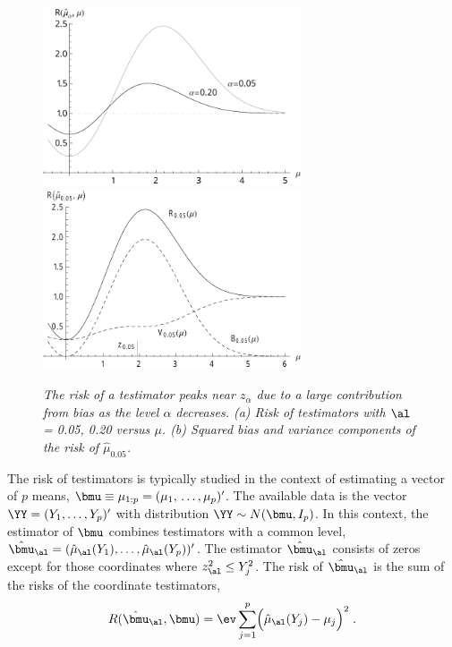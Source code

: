 \documentclass{gSCS2e}
\begin{document}
 \begin{figure}
 \caption{ \label{fig:risk} \sl The risk of a testimator peaks near $z_\alpha$ due to a
 large contribution from bias as the level $\alpha$ decreases. (a) Risk of testimators
 with $\al$ = 0.05, 0.20 versus $\mu$. (b) Squared bias and variance components of the
 risk of $\hat\mu_{0.05}$. }
 \vspace{0.1in}
\centerline{
 \includegraphics[width=3.0in]{figures/risk_a_bw}
 \includegraphics[width=3.0in]{figures/risk_b_bw} }
 \vspace{0.2in}
 \end{figure}
 

 The risk of testimators is typically studied in the context of estimating a vector of $p$
 means, $\bmu \equiv \mu_{1:p} = (\mu_1, \,\ldots, \mu_p)'$.  The available data is the
 vector $\YY = (Y_1, \ldots, Y_p)'$ with distribution $\YY \sim N(\bmu,I_p)$.  In this
 context, the estimator of $\bmu$ combines testimators with a common level,
 $\hat{\bmu}_\al = (\hat\mu_\al(Y_1), \ldots, \hat\mu_\al(Y_p))'$.  The estimator
 $\hat{\bmu}_\al$ consists of zeros except for those coordinates where $z_\al^2 \le
 Y_j^2$.  The risk of $\hat{\bmu}_\al$ is the sum of the risks of the coordinate
 testimators,
 \begin{equation}
    R(\hat{\bmu}_\al, \bmu) 
      = \ev \sum_{j=1}^p \Bigl( \hat{\mu}_{\al}(Y_j) - \mu_j \Bigr)^2 \;.
 \label{eq:risk}
 \end{equation}
\end{document}
